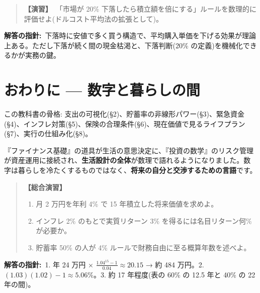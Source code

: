 \documentclass{article}
\begin{document}
\begin{quote}
\textbf{【演習】}\ 「市場が 20\% 下落したら積立額を倍にする」ルールを数理的に評価せよ(ドルコスト平均法の拡張として)。
\end{quote}

\textbf{解答の指針:}\ 下落時に安値で多く買う構造で、平均購入単価を下げる効果が理論上ある。ただし下落が続く間の現金枯渇と、下落判断(20\% の定義)を機械化できるかが実務の鍵。

\section{おわりに — 数字と暮らしの間}

この教科書の骨格: 支出の可視化(§2)、貯蓄率の非線形パワー(§3)、緊急資金(§4)、インフレ対策(§5)、保険の合理条件(§6)、現在価値で見るライフプラン(§7)、実行の仕組み化(§8)。

『ファイナンス基礎』の道具が生活の意思決定に、『投資の数学』のリスク管理が資産運用に接続され、\textbf{生活設計の全体}が数理で語れるようになりました。数字は暮らしを冷たくするものではなく、\textbf{将来の自分と交渉するための言語}です。

\begin{quote}
\textbf{【総合演習】}
\begin{enumerate}
\item 月 2 万円を年利 4\% で 15 年積立した将来価値を求めよ。
\item インフレ 2\% のもとで実質リターン 3\% を得るには名目リターン何\% が必要か。
\item 貯蓄率 50\% の人が 4\% ルールで財務自由に至る概算年数を述べよ。
\end{enumerate}
\end{quote}

\textbf{解答の指針:}\ 1. 年 24 万円 × \(\frac{1.04^{15} - 1}{0.04} \approx 20.15\) → 約 484 万円。2. \((1.03)(1.02) - 1 \approx 5.06\%\)。3. 約 17 年程度(表の 60\% の 12.5 年と 40\% の 22 年の間)。
\end{document}
